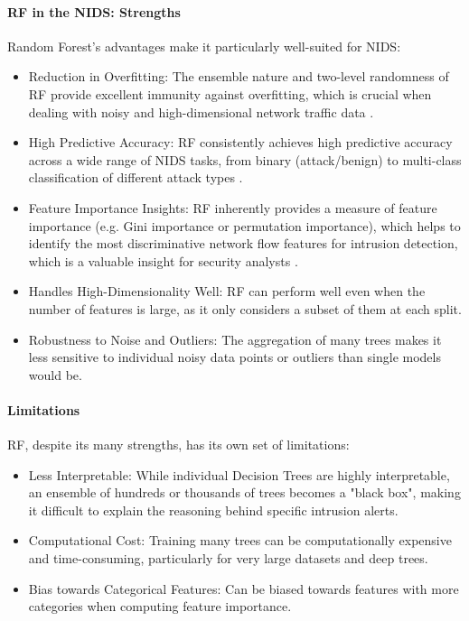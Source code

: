\paragraph{RF in the NIDS: Strengths} 
Random Forest's advantages make it particularly well-suited for NIDS:
\begin{itemize}[noitemsep] 
\item Reduction in Overfitting: The ensemble nature and two-level randomness of RF provide excellent immunity against overfitting, which is crucial when dealing with noisy and high-dimensional network traffic data \parencite{almutairi2025intrusion}.
\item High Predictive Accuracy: RF consistently achieves high predictive accuracy across a wide range of NIDS tasks, from binary (attack/benign) to multi-class classification of different attack types \parencite{shafi2022comprehensive}.
\item Feature Importance Insights: RF inherently provides a measure of feature importance (e.g. Gini importance or permutation importance), which helps to identify the most discriminative network flow features for intrusion detection, which is a valuable insight for security analysts \parencite{wang2023efficient}.
\item Handles High-Dimensionality Well: RF can perform well even when the number of features is large, as it only considers a subset of them at each split.
\item Robustness to Noise and Outliers: The aggregation of many trees makes it less sensitive to individual noisy data points or outliers than single models would be.
\end{itemize} 

\paragraph{Limitations} 
RF, despite its many strengths, has its own set of limitations:
\begin{itemize}[noitemsep] 
\item Less Interpretable: While individual Decision Trees are highly interpretable, an ensemble of hundreds or thousands of trees becomes a "black box", making it difficult to explain the reasoning behind specific intrusion alerts.
\item Computational Cost: Training many trees can be computationally expensive and time-consuming, particularly for very large datasets and deep trees.
\item Bias towards Categorical Features: Can be biased towards features with more categories when computing feature importance.
\end{itemize} 

